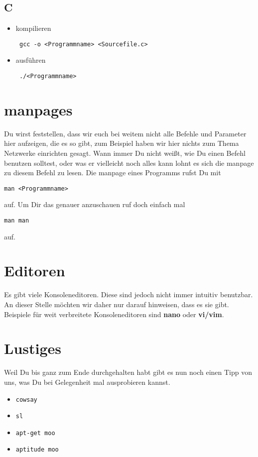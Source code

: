 \documentclass[a4paper,10pt]{article}
\newcommand{\befehl}[1]{
  \begin{center}
    \texttt{#1}
  \end{center}
}
\begin{document}
    \subsection{C}
      \begin{itemize}
	\item kompilieren
	  \befehl{ gcc -o <Programmname> <Sourcefile.c>}
	\item ausführen
	  \befehl{ ./<Programmname>}
      \end{itemize}

  \section{manpages}
    Du wirst feststellen, dass wir euch bei weitem nicht alle Befehle und Parameter hier aufzeigen, die es so gibt, zum Beispiel haben wir hier nichts zum Thema Netzwerke einrichten gesagt. Wann immer Du nicht weißt, wie Du einen Befehl benutzen solltest, oder was er vielleicht noch alles kann lohnt es sich die manpage zu diesem Befehl zu lesen. Die manpage eines Programms rufst Du mit 
    \befehl{man <Programmname>}
    auf. Um Dir das genauer anzuschauen ruf doch einfach mal 
    \befehl{man man}
    auf.

  \section{Editoren}
    Es gibt viele Konsoleneditoren. Diese sind jedoch nicht immer intuitiv benutzbar. An dieser Stelle möchten wir daher nur darauf hinweisen, dass es sie gibt. Beispiele für weit verbreitete Konsoleneditoren sind \textbf{nano} oder \textbf{vi/vim}.

  \section{Lustiges}
    Weil Du bis ganz zum Ende durchgehalten habt gibt es nun noch einen Tipp von uns, was Du bei Gelegenheit mal ausprobieren kannst.
    \begin{itemize} 
      \item \texttt{cowsay}
      \item \texttt{sl}
      \item \texttt{apt-get moo}
      \item \texttt{aptitude moo}
    \end{itemize}
    

    \bigskip
\end{document}
